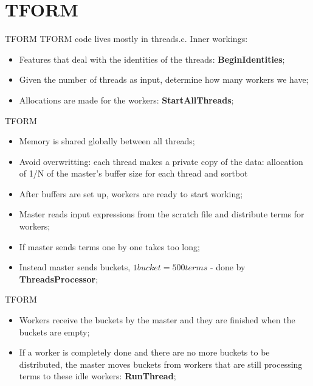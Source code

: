 \documentclass[11pt]{beamer}
\begin{document}
\section{TFORM}

\begin{frame}{TFORM}
TFORM code lives mostly in threads.c. Inner workings:
\begin{itemize}
\item Features that deal with the identities of the threads: \textbf{BeginIdentities};
\item Given the number of threads as input, determine how many workers we have;
\item Allocations are made for the workers: \textbf{StartAllThreads};
\end{itemize}
\end{frame}










\begin{frame}{TFORM}
\begin{itemize}
	\item Memory is shared globally between all threads;
	\item Avoid overwritting: each thread makes a private copy of the data: allocation of 1/N of the master's buffer size for each thread and sortbot
    \item After buffers are set up, workers are ready to start working;
    \item Master reads input expressions from the scratch file and distribute terms for workers;
    \item If master sends terms one by one takes too long;
    \item Instead master sends buckets, $1 bucket = 500 terms$ - done by \textbf{ThreadsProcessor};
\end{itemize}
\end{frame}







\begin{frame}{TFORM}
\begin{itemize}
\item Workers receive the buckets by the master and they are finished when the buckets are empty;
\item If a worker is completely done and there are no more buckets to be distributed, the master moves buckets from workers that are still processing terms to these idle workers: \textbf{RunThread};
\end{itemize}
\end{frame}
\end{document}

